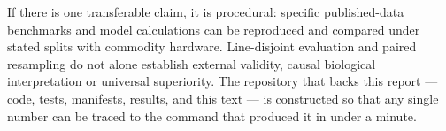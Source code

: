 If there is one transferable claim, it is procedural: specific published-data benchmarks and model calculations can be reproduced and compared under stated splits with commodity hardware. Line-disjoint evaluation and paired resampling do not alone establish external validity, causal biological interpretation or universal superiority. The
repository that backs this report --- code, tests, manifests, results, and
this text --- is constructed so that any single number can be traced to the
command that produced it in under a minute.
